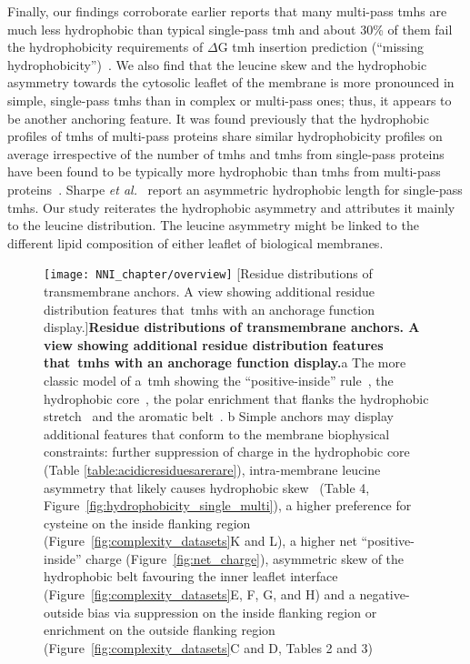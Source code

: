 Finally, our findings corroborate earlier reports that many multi-pass \gls{tmh}s are much less hydrophobic than typical single-pass \gls{tmh} and about 30\% of them fail the hydrophobicity requirements of $\Delta$G \gls{tmh} insertion prediction (``missing hydrophobicity'')~\cite{Hessa2005, Hedin2010, Hessa2007, Ojemalm2012}.
We also find that the leucine skew and the hydrophobic asymmetry towards the cytosolic leaflet of the membrane is more pronounced in simple, single-pass \gls{tmh}s than in complex or multi-pass ones; thus, it appears to be another anchoring feature.
It was found previously that the hydrophobic profiles of \gls{tmh}s of multi-pass proteins share similar hydrophobicity profiles on average irrespective of the number of \gls{tmh}s and \gls{tmh}s from single-pass proteins have been found to be typically more hydrophobic than \gls{tmh}s from multi-pass proteins~\cite{Wong2011}.
Sharpe \textit{et al.}~\cite{Sharpe2010} report an asymmetric hydrophobic length for single-pass \gls{tmh}s.
Our study reiterates the hydrophobic asymmetry and attributes it mainly to the leucine distribution.
The leucine asymmetry might be linked to the different lipid composition of either leaflet of biological membranes.

\begin{figure}[!ht]
\centering
\texttt{[image: NNI\_chapter/overview]}
[Residue distributions of transmembrane anchors.
A view showing additional residue distribution features that~\gls{tmh}s with an anchorage function display.]{\textbf{Residue distributions of transmembrane anchors.
A view showing additional residue distribution features that~\gls{tmh}s with an anchorage function display.}a The more classic model of a~\gls{tmh} showing the ``positive-inside'' rule~\cite{VonHeijne1989}, the hydrophobic core~\cite{Kyte1982}, the polar enrichment that flanks the hydrophobic stretch~\cite{Baeza-Delgado2013} and the aromatic belt~\cite{Granseth2005}.
b Simple anchors may display additional features that conform to the membrane biophysical constraints: further suppression of charge in the hydrophobic core (Table \ref{table:acidicresiduesarerare}), intra-membrane leucine asymmetry that likely causes hydrophobic skew~\cite{Sharpe2010} (Table 4, Figure~\ref{fig:hydrophobicity_single_multi}), a higher preference for cysteine on the inside flanking region (Figure~\ref{fig:complexity_datasets}K and L), a higher net ``positive-inside'' charge (Figure~\ref{fig:net_charge}), asymmetric skew of the hydrophobic belt favouring the inner leaflet interface (Figure~\ref{fig:complexity_datasets}E, F, G, and H) and a negative-outside bias via suppression on the inside flanking region or enrichment on the outside flanking region (Figure~\ref{fig:complexity_datasets}C and D, Tables 2 and 3)}

\label{fig:overview}
\end{figure}


